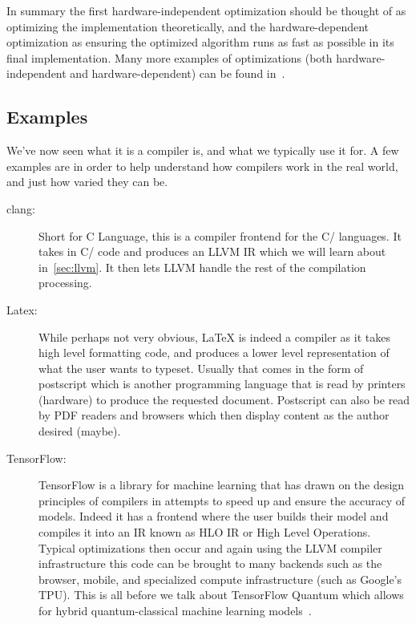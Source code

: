 In summary the first hardware-independent optimization should be thought of as optimizing the implementation theoretically, and the hardware-dependent optimization as ensuring the optimized algorithm runs as fast as possible in its final implementation.
Many more examples of optimizations (both hardware-independent and hardware-dependent) can be found in~\cite[Chapter~8]{compiler-optimizations}.

\subsection{Examples}\label{sec:compiler-examples}

We've now seen what it is a compiler is, and what we typically use it for.
A few examples are in order to help understand how compilers work in the real world, and just how varied they can be.

\begin{description}
    \item[clang:] Short for C Language, this is a compiler frontend for the C/\CPP{} languages. It takes in C/\CPP{} code and produces an LLVM \ac{IR} which we will learn about in~\cref{sec:llvm}. It then lets LLVM handle the rest of the compilation processing.
    \item[Latex:] While perhaps not very obvious, \LaTeX{} is indeed a compiler as it takes high level formatting code, and produces a lower level representation of what the user wants to typeset. Usually that comes in the form of postscript which is another programming language that is read by printers (hardware) to produce the requested document. Postscript can also be read by PDF readers and browsers which then display content as the author desired (maybe).
    \item[TensorFlow:] TensorFlow is a library for machine learning that has drawn on the design principles of compilers in attempts to speed up and ensure the accuracy of models. Indeed it has a frontend where the user builds their model and compiles it into an \ac{IR} known as HLO \ac{IR} or High Level Operations. Typical optimizations then occur and again using the LLVM compiler infrastructure this code can be brought to many backends such as the browser, mobile, and specialized compute infrastructure (such as Google's \ac{TPU}). This is all before we talk about TensorFlow Quantum which allows for hybrid quantum-classical machine learning models~\cite{tensoflowquantum}.
\end{description}

